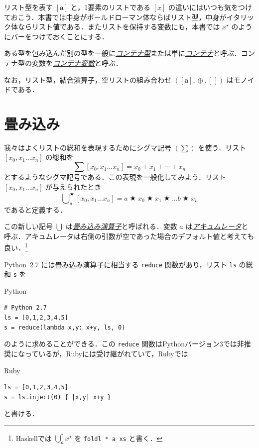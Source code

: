 \documentclass[a4paper]{jsbook}
\newcommand{\programminglanguage}[1]{\textsf{#1}}
\newcommand{\haskell}{\programminglanguage{Haskell}}
\newcommand{\python}{\programminglanguage{Python}}
\newcommand{\ruby}{\programminglanguage{Ruby}}
\newcommand{\keyword}[1]{{\underline{\emph{#1}}}}
\newcommand{\code}[1]{\texttt{#1}}
\newenvironment{pythoncode}{\begin{itembox}[r]{\python}}{\end{itembox}}
\newenvironment{rubycode}{\begin{itembox}[r]{\ruby}}{\end{itembox}}
\newcommand{\mType}[1]{\mathbf{#1}}
\newcommand{\mListType}[1]{[\mType{#1}]}
\newcommand{\mEmptyList}{{[\,]}}
\newcommand{\mListWith}[1]{\left[#1\right]}
\newcommand{\mTupleWith}[1]{\left(#1\right)}
\newcommand{\mList}[1]{{#1}^\mathrm{\star}}
\DeclareMathOperator{\mBinOp}{\bigstar}
\DeclareMathOperator*{\mFoldLeft}{\bigcup}
\DeclareMathOperator{\mAppend}{\oplus}
\begin{document}
リスト型を表す $\mListType{a}$ と，1要素のリストである $\mListWith{x}$ の違いにはいつも気をつけておこう．本書では中身がボールドローマン体ならばリスト型，中身がイタリック体ならリスト値である．またリストを保持する変数にも，本書では $\mList{x}$ のようにバーをつけておくことにする．

ある型を包み込んだ別の型を一般に\keyword{コンテナ型}または単に\keyword{コンテナ}と呼ぶ．コンテナ型の変数を\keyword{コンテナ変数}と呼ぶ．

なお，リスト型，結合演算子，空リストの組み合わせ $\mTupleWith{\mListType{a},\mAppend,\mEmptyList}$ はモノイドである．

\section{畳み込み}

我々はよくリストの総和を表現するためにシグマ記号 $(\sum)$ を使う．リスト $\mListWith{x_0,x_1\dots x_n}$ の総和を
\begin{equation}
\sum\mListWith{x_0,x_1\dots x_n}=x_0+x_1+\dotsb+x_n
\end{equation}
とするようなシグマ記号である．この表現を一般化してみよう．リスト $\mListWith{x_0,x_1\dots x_n}$ が与えられたとき
\begin{equation}
\mFoldLeft^{\mBinOp}_{a}\mListWith{x_0,x_1\dots x_n}
=a\mBinOp x_0\mBinOp x_1\mBinOp\dots b\mBinOp x_n
\end{equation}
であると定義する．

この新しい記号 $\mFoldLeft$ は\keyword{畳み込み演算子}と呼ばれる．変数 $a$ は\keyword{アキュムレータ}と呼ぶ．アキュムレータは右側の引数が空であった場合のデフォルト値と考えても良い．\footnote{\haskell では $\mFoldLeft^{*}_a\mList{x}$ を \code{foldl * a xs} と書く．}

\python\ 2.7 には畳み込み演算子に相当する \code{reduce} 関数があり，リスト \code{ls} の総和 \code{s} を
\begin{pythoncode}
\begin{verbatim}
# Python 2.7
ls = [0,1,2,3,4,5]
s = reduce(lambda x,y: x+y, ls, 0)
\end{verbatim}
\end{pythoncode}
のように求めることができる．この \code{reduce} 関数は\python バージョン3では非推奨になっているが，\ruby には受け継がれていて，\ruby では
\begin{rubycode}
\begin{verbatim}
ls = [0,1,2,3,4,5]
s = ls.inject(0) { |x,y| x+y }
\end{verbatim}
\end{rubycode}
と書ける．
\end{document}
